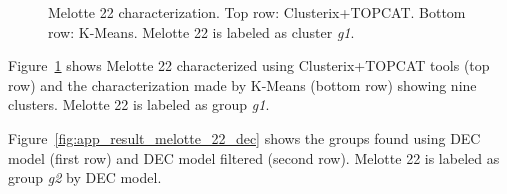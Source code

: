 \documentclass[11pt,a4paper,english,twocolumn]{article}
\begin{document}
\begin{figure}[htbp]
\begin{subfigure}{\columnwidth}
\begin{subfigure}[t]{0.30\textwidth}
    \end{subfigure}
  \end{subfigure}
  \caption{Melotte 22 characterization.
           Top row: Clusterix+TOPCAT. Bottom row: K-Means.
           Melotte 22 is labeled as cluster \emph{g1}.}
  \label{fig:app_result_melotte_22_clusterix_kmeans}
\end{figure}

Figure~\ref{fig:app_result_melotte_22_clusterix_kmeans} shows Melotte 22
characterized using Clusterix+TOPCAT tools (top row) and the characterization
made by K-Means (bottom row) showing nine clusters. Melotte 22 is labeled as
group \emph{g1}.

Figure~\ref{fig:app_result_melotte_22_dec} shows the groups found using
DEC model (first row) and DEC model filtered (second row).
Melotte 22 is labeled as group \emph{g2} by DEC model.
\end{document}
